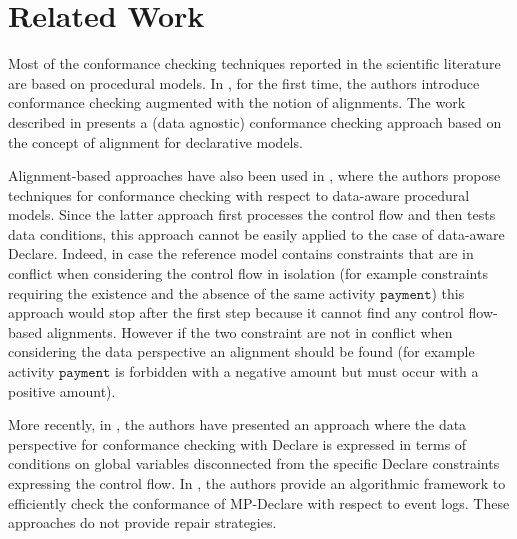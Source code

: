 \section{Related Work}
\label{sec:related}

Most of the conformance checking techniques reported in the scientific literature are based on procedural models. In \cite{DBLP:conf/edoc/AdriansyahDA11}, for the first time, the authors introduce conformance checking augmented with the notion of alignments. The work described in \cite{LeoniMA12} presents a (data agnostic) conformance checking approach based on the concept of alignment for declarative models.

Alignment-based approaches have also been used in \cite{MultiPerspective}, where the authors propose techniques for conformance checking with respect to data-aware procedural models. Since the latter approach first processes the control flow and then tests data conditions, this approach cannot be easily applied to the case of data-aware Declare. Indeed, in case the reference model contains constraints that are in conflict when considering the control flow in isolation (for example constraints requiring the existence and the absence of the same activity $\texttt{payment}$) this approach would stop after the first step because it cannot find any control flow-based alignments. However if the two constraint are not in conflict when considering the data perspective an alignment should be found (for example activity $\texttt{payment}$ is forbidden with a negative amount but must occur with a positive amount).

More recently, in \cite{Borrego014}, the authors have presented an approach where the data perspective for conformance checking with Declare is expressed in terms of conditions on global variables disconnected from the specific Declare constraints expressing the control flow. In \cite{BurattinMS16}, the authors provide an algorithmic framework to efficiently check the conformance of MP-Declare with respect to event logs. These approaches do not provide repair strategies. 